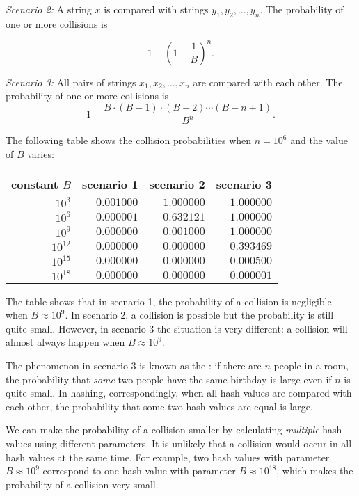 \textit{Scenario 2:} A string $x$ is compared with strings
$y_1,y_2,\ldots,y_n$.
The probability of one or more collisions is

\[1-(1-\frac{1}{B})^n.\]

\textit{Scenario 3:} All pairs of strings $x_1,x_2,\ldots,x_n$
are compared with each other.
The probability of one or more collisions is
\[ 1 - \frac{B \cdot (B-1) \cdot (B-2) \cdots (B-n+1)}{B^n}.\]

The following table shows the collision probabilities
when $n=10^6$ and the value of $B$ varies:

\begin{center}
    \begin{tabular}{rrrr}
        constant $B$ & scenario 1 & scenario 2 & scenario 3 \\
        \hline
        $10^3$       & $0.001000$ & $1.000000$ & $1.000000$ \\
        $10^6$       & $0.000001$ & $0.632121$ & $1.000000$ \\
        $10^9$       & $0.000000$ & $0.001000$ & $1.000000$ \\
        $10^{12}$    & $0.000000$ & $0.000000$ & $0.393469$ \\
        $10^{15}$    & $0.000000$ & $0.000000$ & $0.000500$ \\
        $10^{18}$    & $0.000000$ & $0.000000$ & $0.000001$ \\
    \end{tabular}
\end{center}

The table shows that in scenario 1,
the probability of a collision is negligible
when $B \approx 10^9$.
In scenario 2, a collision is possible but the
probability is still quite small.
However, in scenario 3 the situation is very different:
a collision will almost always happen when
$B \approx 10^9$.


The phenomenon in scenario 3 is known as the
: if there are $n$ people
in a room, the probability that \emph{some} two people
have the same birthday is large even if $n$ is quite small.
In hashing, correspondingly, when all hash values are compared
with each other, the probability that some two
hash values are equal is large.

We can make the probability of a collision
smaller by calculating \emph{multiple} hash values
using different parameters.
It is unlikely that a collision would occur
in all hash values at the same time.
For example, two hash values with parameter
$B \approx 10^9$ correspond to one hash
value with parameter $B \approx 10^{18}$,
which makes the probability of a collision very small.

